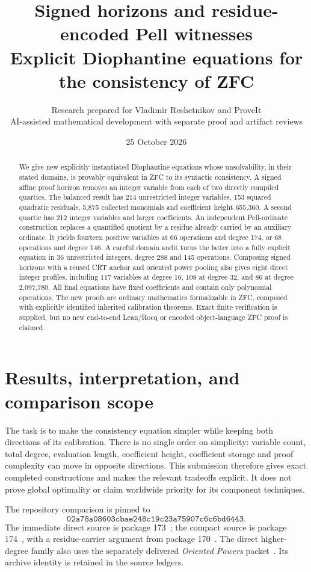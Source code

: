 \documentclass[11pt]{article}
\title{\textbf{Signed horizons and residue-encoded Pell witnesses}\\[5pt]
\large Explicit Diophantine equations for the consistency of ZFC}
\author{Research prepared for Vladimir Reshetnikov and ProveIt\\
\small AI-assisted mathematical development with separate proof and artifact reviews}
\date{25 October 2026}
\begin{document}
\maketitle
\begin{abstract}
We give new explicitly instantiated Diophantine equations whose
unsolvability, in their stated domains, is provably equivalent in ZFC
to its syntactic consistency. A signed affine proof horizon removes an
integer variable from each of two directly compiled quartics. The balanced
result has 214 unrestricted integer variables, 153 squared quadratic
residuals, 5,875 collected monomials and coefficient height 655,360.
A second quartic has 212 integer variables and larger coefficients.
An independent Pell-ordinate construction replaces a quantified quotient
by a residue already carried by an auxiliary ordinate. It yields fourteen
positive variables at 66 operations and degree 174, or 68 operations and
degree 146. A careful domain audit turns the latter into a fully explicit
equation in 36 unrestricted integers, degree 288 and 145 operations.
Composing signed horizons with a reused CRT anchor and oriented power
pooling also gives eight direct integer profiles, including 117 variables
at degree 16, 108 at degree 32, and 86 at degree 2,097,780.
All final equations have fixed coefficients and contain only polynomial
operations. The new proofs are ordinary mathematics formalizable in ZFC,
composed with explicitly identified inherited calibration theorems.
Exact finite verification is supplied, but no new end-to-end
Lean/Rocq or encoded object-language ZFC proof is claimed.
\end{abstract}

\newpage
\tableofcontents
\newpage
\section{Results, interpretation, and comparison scope}
\label{sec:results}

The task is to make the consistency equation simpler while keeping both
directions of its calibration. There is no single order on simplicity:
variable count, total degree, evaluation length, coefficient height,
coefficient storage and proof complexity can move in opposite directions.
This submission therefore gives exact completed constructions and makes
the relevant tradeoffs explicit. It does not prove global optimality or
claim worldwide priority for its component techniques.

The repository comparison is pinned to
\[
\texttt{02a78a08603cbae248c19c23a75907c6c6bd6443}.
\]
The immediate direct source is package 173~\cite{proveit173}; the compact
source is package 174~\cite{proveit174}, with a residue-carrier argument
from package 170~\cite{proveit170}. The direct higher-degree family also
uses the separately delivered \emph{Oriented Powers} packet~\cite{oriented}.
Its archive identity is retained in the source ledgers.
\end{document}
